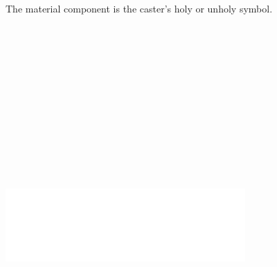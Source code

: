 \begin{multicols}{2}
The material component is the caster's holy or unholy symbol.

\noindent\includegraphics[width=3.6in, height=6in]{testblock.pdf}

\end{multicols}

\pagebreak \thispagestyle{empty} \label{grignrchained} 


